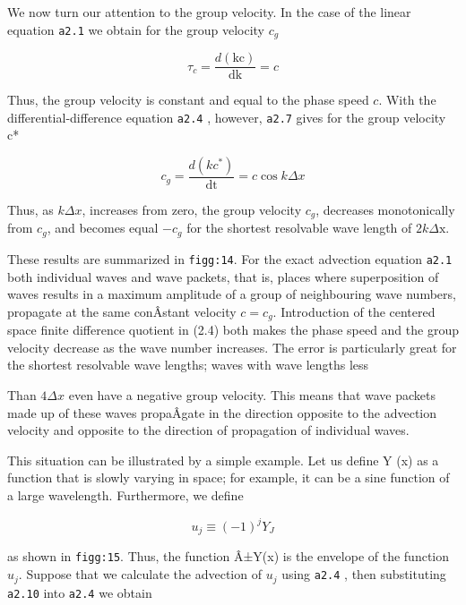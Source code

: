 We now turn our attention to the group velocity. In the case of the
linear equation \texttt{a2.1} we obtain for the group velocity \(c_{g}\)

{\[\tau_{c} = \frac{d\left( \text{kc} \right)}{\text{dk}} = c\]}

Thus, the group velocity is constant and equal to the phase speed \(c\).
With the differential-difference equation \texttt{a2.4} , however,
\texttt{a2.7} gives for the group velocity c*

{\[c_{g} = \frac{d\left( kc^{*} \right)}{\text{dt}} = c\cos{k\Delta x}\]}

Thus, as \(k\Delta x\), increases from zero, the group velocity
\(c_{g}\), decreases monotonically from \(c_{g}\), and becomes equal
\({- c}_{g}\) for the shortest resolvable wave length of
\(2k\Delta\text{x.}\)

These results are summarized in \texttt{figg:14}. For the exact
advection equation \texttt{a2.1} both individual waves and wave packets,
that is, places where superposition of waves results in a maximum
amplitude of a group of neighbouring wave numbers, propagate at the same
conÂ­stant velocity \(c = c_{g}\). Introduction of the centered space
finite difference quotient in (2.4) both makes the phase speed and the
group velocity decrease as the wave number increases. The error is
particularly great for the shortest resolvable wave lengths; waves with
wave lengths less

\begin{figure}
\centering
{}
\caption{}
\end{figure}

Than \(4\Delta x\) even have a negative group velocity. This means that
wave packets made up of these waves propaÂ­gate in the direction opposite
to the advection velocity and opposite to the direction of propagation
of individual waves.

This situation can be illustrated by a simple example. Let us define Y
(x) as a function that is slowly varying in space; for example, it can
be a sine function of a large wavelength. Furthermore, we define

{\[u_{j} \equiv \left( - 1 \right)^{j}Y_{J}\]}

as shown in \texttt{figg:15}. Thus, the function Â±Y(x) is the envelope
of the function \(u_{j}\). Suppose that we calculate the advection of
\(u_{j}\) using \texttt{a2.4} , then substituting \texttt{a2.10} into
\texttt{a2.4} we obtain

